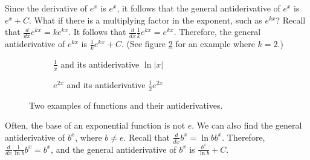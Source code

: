 Since the derivative of $e^{x}$ is $e^{x}$, it follows that the general 
antiderivative of $e^{x}$ is $e^{x} + C$. What if there is a 
multiplying factor in the exponent, such as $e^{kx}$? Recall that 
$\frac{d}{dx} e^{kx} = k e^{kx}$. It follows that $\frac{d}{dx} 
\frac{1}{k} e^{kx} = e^{kx}$. Therefore, the general antiderivative of 
$e^{kx}$ is $\frac{1}{k} e^{kx} + C$. (See figure \ref{fig:antiexp_sub} 
for an example where $k = 2$.)

\begin{figure}[H]
\centering
\begin{subfigure}{0.48\textwidth}
\centering
{}
\caption{$\frac{1}{x}$ and its antiderivative $\ln|x|$}
\label{fig:naturallog_sub}
\end{subfigure}\hfill
\begin{subfigure}{0.48\textwidth}
\centering
{}
\caption{$e^{2x}$ and its antiderivative $\frac{1}{2}e^{2x}$}
\label{fig:antiexp_sub}
\end{subfigure}

\caption{Two examples of functions and their antiderivatives.}
\label{fig:anti_combined}
\end{figure}


Often, the base of an exponential function is not $e$. We can also find 
the general antiderivative of $b^{x}$, where $b \neq e$. Recall that 
$\frac{d}{dx} b^x = \ln{b} b^x$. Therefore, $\frac{d}{dx} \frac{1}{\ln{b}} 
b^x = b^x$, and the general antiderivative of $b^x$ is $\frac{b^x}{\ln{b}} + C$. 

